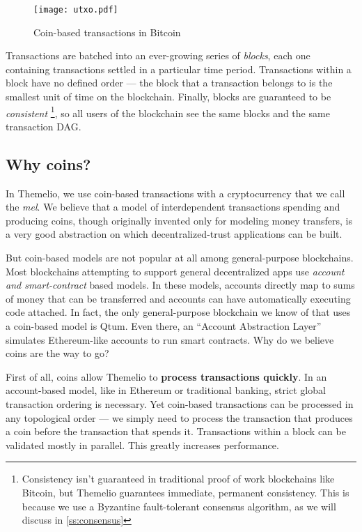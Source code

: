 \documentclass[headinclude,12pt]{scrbook}
\begin{document}
\begin{figure}
    \centering \texttt{[image: utxo.pdf]}
    \caption{Coin-based transactions in Bitcoin}
    \label{fig:utxo}
\end{figure}


Transactions are batched into an ever-growing series of \emph{blocks}, each one containing transactions settled in a particular time period. Transactions within a block have no defined order --- the block that a transaction belongs to is the smallest unit of time on the blockchain. Finally, blocks are guaranteed to be \emph{consistent} \footnote{Consistency isn't guaranteed in traditional proof of work blockchains like Bitcoin, but Themelio guarantees immediate, permanent consistency. This is because we use a Byzantine fault-tolerant consensus algorithm, as we will discuss in \ref{ss:consensus}}, so all users of the blockchain see the same blocks and the same transaction DAG.

\subsection{Why coins?}

In Themelio, we use coin-based transactions with a cryptocurrency that we call the \emph{mel}. We believe that a model of interdependent transactions spending and producing coins, though originally invented only for modeling money transfers, is a very good abstraction on which decentralized-trust applications can be built.

But coin-based models are not popular at all among general-purpose blockchains. Most blockchains attempting to support general decentralized apps use \emph{account and smart-contract} based models. In these models, accounts directly map to sums of money that can be transferred and accounts can have automatically executing code attached. In fact, the only general-purpose blockchain we know of that uses a coin-based model is Qtum\cite{qtum}. Even there, an ``Account Abstraction Layer'' simulates Ethereum-like accounts to run smart contracts. Why do we believe coins are the way to go?

First of all, coins allow Themelio to \textbf{process transactions quickly}. In an account-based model, like in Ethereum or traditional banking, strict global transaction ordering is necessary. Yet coin-based transactions can be processed in any topological order --- we simply need to process the transaction that produces a coin before the transaction that spends it. Transactions within a block can be validated mostly in parallel. This greatly increases performance.
\end{document}

